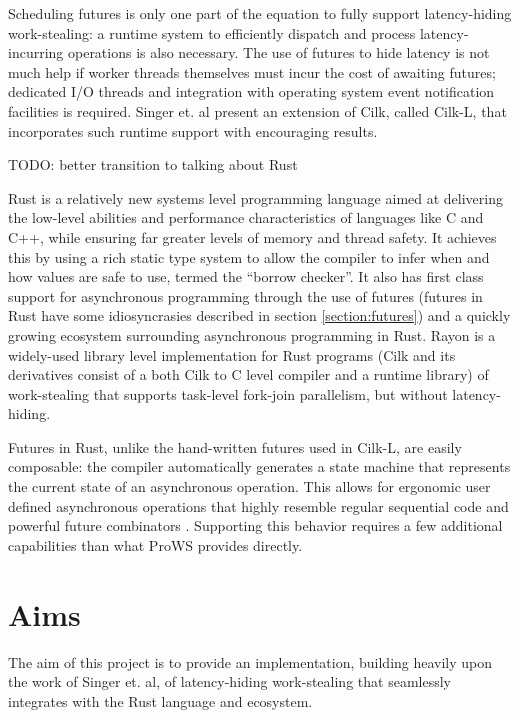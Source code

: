 \documentclass[bsc,frontabs,singlespacing,parskip,deptreport,normalheadings]{infthesis}
\begin{document}
Scheduling futures is only one part of the equation to fully support
latency-hiding work-stealing: a runtime system to efficiently dispatch and
process latency-incurring operations is also necessary. The use of futures to
hide latency is not much help if worker threads themselves must incur the cost
of awaiting futures; dedicated I/O threads and integration with operating system
event notification facilities is required. Singer et. al
\cite{singer_scheduling_2019} present an extension of Cilk, called Cilk-L, that
incorporates such runtime support with encouraging results.

TODO: better transition to talking about Rust

Rust \cite{matsakis_rust_2014} is a relatively new systems level programming
language aimed at delivering the low-level abilities and performance
characteristics of languages like C and C++, while ensuring far greater levels
of memory and thread safety. It achieves this by using a rich static type
system to allow the compiler to infer when and how values are safe to use,
termed the ``borrow checker''. It also has first class support for asynchronous
programming through the use of futures (futures in Rust have some idiosyncrasies
described in section \ref{section:futures}) and a quickly growing
ecosystem surrounding asynchronous programming in Rust. Rayon
\cite{noauthor_rayon_2022, noauthor_baby_nodate, stone_how_2021} is a
widely-used library level implementation for Rust programs (Cilk and its
derivatives consist of a both Cilk to C level compiler and a runtime library) of
work-stealing that supports task-level fork-join parallelism, but without
latency-hiding.

Futures in Rust, unlike the hand-written futures used in Cilk-L, are easily
composable: the compiler automatically generates a state machine that represents
the current state of an asynchronous operation. This allows for ergonomic user
defined asynchronous operations that highly resemble regular sequential code and
powerful future combinators \cite{noauthor_futuresfuture_nodate}. Supporting
this behavior requires a few additional capabilities than what ProWS provides
directly.

\section{Aims}

The aim of this project is to provide an implementation, building heavily upon
the work of Singer et. al, of latency-hiding work-stealing that seamlessly
integrates with the Rust language and ecosystem.
\end{document}
